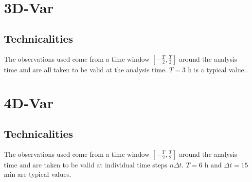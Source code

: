 \documentclass{report}
\begin{document}
\chapter{3D-Var}
\label{chap:3d-var}

\section{Technicalities}
\label{sec:technicalities_3d-var}

The observations used come from a time window $\left[-\frac{T}{2}, \frac{T}{2}\right]$ around the analysis time and are all taken to be valid at the analysis time. $T = 3$ h is a typical value..

\chapter{4D-Var}
\label{chap:4d-var}
%

\section{Technicalities}
\label{sec:technicalities_4d-var}

The observations used come from a time window $\left[-\frac{T}{2}, \frac{T}{2}\right]$ around the analysis time and are taken to be valid at individual time steps $n\Delta t$. $T = 6$ h and $\Delta t = 15$ min are typical values.

\appendix

\printbibliography
\end{document}
